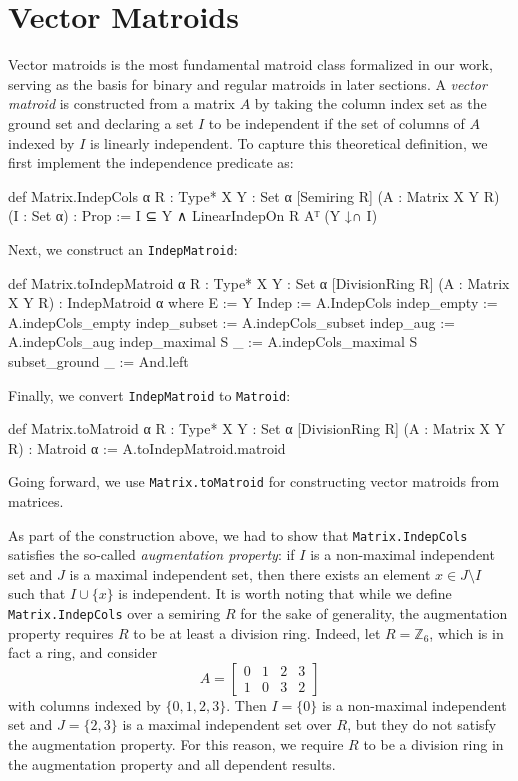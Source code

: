 \section{Vector Matroids}

Vector matroids \cite{Oxley2011,Truemper2016} is the most fundamental matroid class formalized in our work, serving as the basis for binary and regular matroids in later sections. A \emph{vector matroid} is constructed from a matrix $A$ by taking the column index set as the ground set and declaring a set $I$ to be independent if the set of columns of $A$ indexed by $I$ is linearly independent. To capture this theoretical definition, we first implement the independence predicate as:
\begin{leancode}
def Matrix.IndepCols {α R : Type*} {X Y : Set α}
    [Semiring R] (A : Matrix X Y R) (I : Set α) :
    Prop :=
  I ⊆ Y ∧ LinearIndepOn R Aᵀ (Y ↓∩ I)
\end{leancode}
Next, we construct an \texttt{IndepMatroid}:
\begin{leancode}
def Matrix.toIndepMatroid
    {α R : Type*} {X Y : Set α}
    [DivisionRing R] (A : Matrix X Y R) :
    IndepMatroid α where
  E := Y
  Indep := A.IndepCols
  indep_empty := A.indepCols_empty
  indep_subset := A.indepCols_subset
  indep_aug := A.indepCols_aug
  indep_maximal S _ := A.indepCols_maximal S
  subset_ground _ := And.left
\end{leancode}
Finally, we convert \texttt{IndepMatroid} to \texttt{Matroid}:
\begin{leancode}
def Matrix.toMatroid {α R : Type*} {X Y : Set α}
    [DivisionRing R] (A : Matrix X Y R) :
    Matroid α :=
  A.toIndepMatroid.matroid
\end{leancode}
Going forward, we use \texttt{Matrix.toMatroid} for constructing vector matroids from matrices.

As part of the construction above, we had to show that \texttt{Matrix.IndepCols} satisfies the so-called \emph{augmentation property}: if $I$ is a non-maximal independent set and $J$ is a maximal independent set, then there exists an element $x \in J \setminus I$ such that $I \cup \{x\}$ is independent. It is worth noting that while we define \texttt{Matrix.IndepCols} over a semiring $R$ for the sake of generality, the augmentation property requires $R$ to be at least a division ring. Indeed, let $R = \mathbb{Z}_{6}$, which is in fact a ring, and consider
\[
    A = \begin{bmatrix}
       0 & 1 & 2 & 3 \\
       1 & 0 & 3 & 2
    \end{bmatrix}
\]
with columns indexed by $\{0, 1, 2, 3\}$. Then $I = \{0\}$ is a non-maximal independent set and $J = \{2, 3\}$ is a maximal independent set over $R$, but they do not satisfy the augmentation property. For this reason, we require $R$ to be a division ring in the augmentation property and all dependent results.

